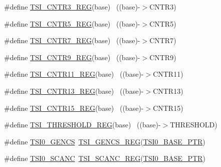 \begin{DoxyCompactItemize}
\item 
\#define \hyperlink{group___t_s_i___register___accessor___macros_ga1abf4e67869018b5fda8466627fdf6ac}{T\+S\+I\+\_\+\+C\+N\+T\+R3\+\_\+\+R\+EG}(base)                                        ~((base)-\/$>$C\+N\+T\+R3)
\item 
\#define \hyperlink{group___t_s_i___register___accessor___macros_gae18562b4206a5154086131349befffe5}{T\+S\+I\+\_\+\+C\+N\+T\+R5\+\_\+\+R\+EG}(base)                                        ~((base)-\/$>$C\+N\+T\+R5)
\item 
\#define \hyperlink{group___t_s_i___register___accessor___macros_gac1490787aebce3053c85c5742138e611}{T\+S\+I\+\_\+\+C\+N\+T\+R7\+\_\+\+R\+EG}(base)                                        ~((base)-\/$>$C\+N\+T\+R7)
\item 
\#define \hyperlink{group___t_s_i___register___accessor___macros_ga47c15fa313e21645ab38cf808bd08abb}{T\+S\+I\+\_\+\+C\+N\+T\+R9\+\_\+\+R\+EG}(base)                                        ~((base)-\/$>$C\+N\+T\+R9)
\item 
\#define \hyperlink{group___t_s_i___register___accessor___macros_gabb3ec6c9ffd38a29d4917c9c74047087}{T\+S\+I\+\_\+\+C\+N\+T\+R11\+\_\+\+R\+EG}(base)                                      ~((base)-\/$>$C\+N\+T\+R11)
\item 
\#define \hyperlink{group___t_s_i___register___accessor___macros_ga4781f0cae7aee00361b1d6dd24ebb375}{T\+S\+I\+\_\+\+C\+N\+T\+R13\+\_\+\+R\+EG}(base)                                      ~((base)-\/$>$C\+N\+T\+R13)
\item 
\#define \hyperlink{group___t_s_i___register___accessor___macros_ga6999a403171b9b12a3caa9d5c0da77b6}{T\+S\+I\+\_\+\+C\+N\+T\+R15\+\_\+\+R\+EG}(base)                                      ~((base)-\/$>$C\+N\+T\+R15)
\item 
\#define \hyperlink{group___t_s_i___register___accessor___macros_ga2eef7cbc055e4e7eead54c59a1bda753}{T\+S\+I\+\_\+\+T\+H\+R\+E\+S\+H\+O\+L\+D\+\_\+\+R\+EG}(base)                                ~((base)-\/$>$T\+H\+R\+E\+S\+H\+O\+LD)
\item 
\#define \hyperlink{group___t_s_i___register___accessor___macros_gabe033284ba64fa3097ff12d10c0b5e85}{T\+S\+I0\+\_\+\+G\+E\+N\+CS}~\hyperlink{group___t_s_i___register___accessor___macros_gacb2292491464fa55b36996380b09077f}{T\+S\+I\+\_\+\+G\+E\+N\+C\+S\+\_\+\+R\+EG}(\hyperlink{group___t_s_i___peripheral_gaf98ea1cd15559446e0cfc1ae177751f6}{T\+S\+I0\+\_\+\+B\+A\+S\+E\+\_\+\+P\+TR})
\item 
\#define \hyperlink{group___t_s_i___register___accessor___macros_ga97a8ffede71c53512f5e1bdef2fac778}{T\+S\+I0\+\_\+\+S\+C\+A\+NC}~\hyperlink{group___t_s_i___register___accessor___macros_gaa04f34529d4fc762bc30470edc1d5f38}{T\+S\+I\+\_\+\+S\+C\+A\+N\+C\+\_\+\+R\+EG}(\hyperlink{group___t_s_i___peripheral_gaf98ea1cd15559446e0cfc1ae177751f6}{T\+S\+I0\+\_\+\+B\+A\+S\+E\+\_\+\+P\+TR})

\end{DoxyCompactItemize}
